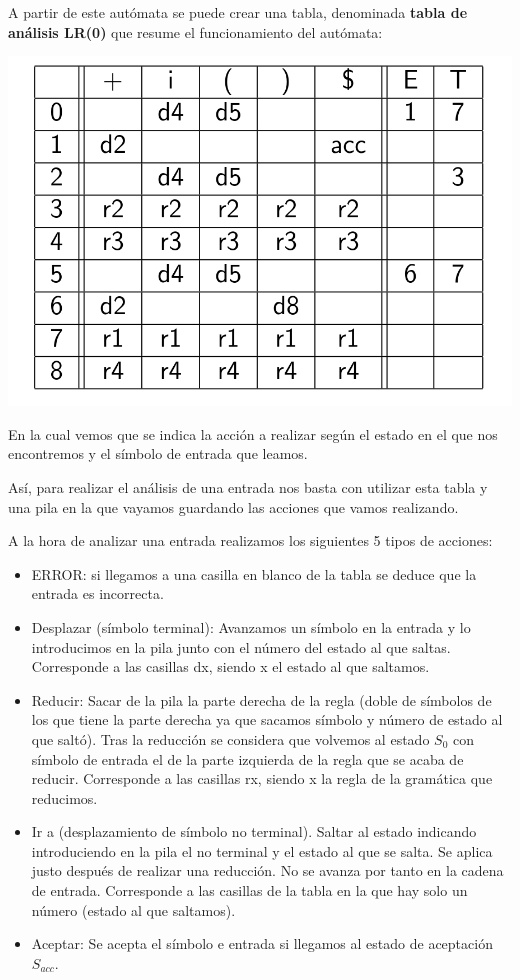 \documentclass{apuntes}
\begin{document}
\begin{example}
A partir de este autómata se puede crear una tabla, denominada \textbf{tabla de análisis LR(0)} que resume el funcionamiento del autómata:

\begin{center}
\includegraphics[scale=0.3]{img/tablaanallr0.jpg}
\end{center}

En la cual vemos que se indica la acción a realizar según el estado en el que nos encontremos y el símbolo de entrada que leamos.

Así, para realizar el análisis de una entrada nos basta con utilizar esta tabla y una pila en la que vayamos guardando las acciones que vamos realizando.

A la hora de analizar una entrada realizamos los siguientes 5 tipos de acciones:
\begin{itemize}
\item ERROR: si llegamos a una casilla en blanco de la tabla se deduce que la entrada es incorrecta.
\item Desplazar (símbolo terminal): Avanzamos un símbolo en la entrada y lo introducimos en la pila junto con el número del estado al que saltas. Corresponde a las casillas dx, siendo x el estado al que saltamos.
\item Reducir: Sacar de la pila la parte derecha de la regla (doble de símbolos de los que tiene la parte derecha ya que sacamos símbolo y número de estado al que saltó). Tras la reducción se considera que volvemos al estado $S_0$ con símbolo de entrada el de la parte izquierda de la regla que se acaba de reducir. Corresponde a las casillas rx, siendo x la regla de la gramática que reducimos.
\item Ir a (desplazamiento de símbolo no terminal). Saltar al estado indicando introduciendo en la pila el no terminal y el estado al que se salta. Se aplica justo después de realizar una reducción. No se avanza por tanto en la cadena de entrada. Corresponde a las casillas de la tabla en la que hay solo un número (estado al que saltamos).
\item Aceptar: Se acepta el símbolo e entrada si llegamos al estado de aceptación $S_{acc}$.
\end{itemize}


\end{example}
\end{document}
